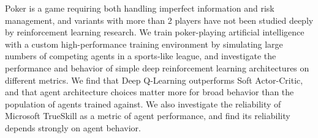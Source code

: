 Poker is a game requiring both handling imperfect information and risk management, and variants with more than 2 players have not been studied deeply by reinforcement learning research. We train poker-playing artificial intelligence with a custom high-performance training environment by simulating large numbers of competing agents in a sports-like league, and investigate the performance and behavior of simple deep reinforcement learning architectures on different metrics. We find that Deep Q-Learning outperforms Soft Actor-Critic, and that agent architecture choices matter more for broad behavior than the population of agents trained against. We also investigate the reliability of Microsoft TrueSkill as a metric of agent performance, and find its reliability depends strongly on agent behavior.